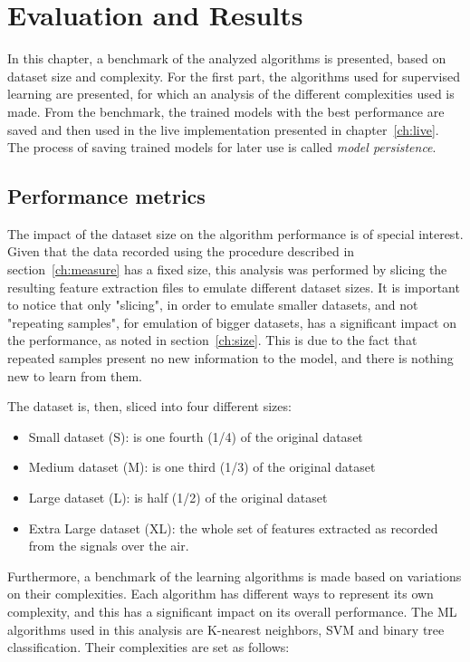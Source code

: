 \acresetall
\chapter{Evaluation and Results}\label{ch:evaluation}
In this chapter, a benchmark of the analyzed algorithms is presented, based on dataset size and complexity. For the first part, the algorithms used for supervised learning are presented, for which an analysis of the different complexities used is made. From the benchmark, the trained models with the best performance are saved and then used in the live implementation presented in chapter~\ref{ch:live}. The process of saving trained models for later use is called \emph{model persistence}.

\section{Performance metrics}\label{ch:performance}

The impact of the dataset size on the algorithm performance is of special interest. Given that the data recorded using the procedure described in section~\ref{ch:measure} has a fixed size, this analysis was performed by slicing the resulting feature extraction files to emulate different dataset sizes. It is important to notice that only "slicing", in order to emulate smaller datasets, and not "repeating samples", for emulation of bigger datasets, has a significant impact on the performance, as noted in section~\ref{ch:size}. This is due to the fact that repeated samples present no new information to the model, and there is nothing new to learn from them.

The dataset is, then, sliced into four different sizes:

\begin{itemize}
    \item Small dataset (S): is one fourth (1/4) of the original dataset
    \item Medium dataset (M): is one third (1/3) of the original dataset
    \item Large dataset (L): is half (1/2) of the original dataset
    \item Extra Large dataset (XL): the whole set of features extracted as recorded from the signals over the air.
\end{itemize}

Furthermore, a benchmark of the learning algorithms is made based on variations on their complexities. Each algorithm has different ways to represent its own complexity, and this has a significant impact on its overall performance. The \ac{ML} algorithms used in this analysis are K-nearest neighbors, \ac{SVM} and binary tree classification. Their complexities are set as follows:

